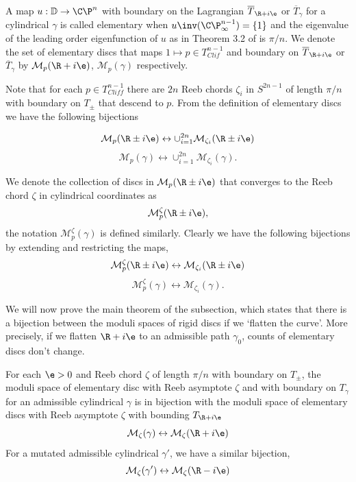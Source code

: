 \begin{defn}
A map $u: \mathbb{D} \to \C\P^n$  with boundary on the Lagrangian $\overline T_{\R+i\e}$ or $\overline T_\gamma$ for a cylindrical $\gamma$  is called elementary when $u\inv(\C\P_\infty^{n-1})=\{1\}$ and the eigenvalue of the leading order eigenfunction of $u$ as in Theorem 3.2 of \cite{schm} is $\pi/n$. We denote the set of elementary discs that maps $1 \mapsto p \in T^{n-1}_{Clif}$  and boundary on $\overline T_{\R+i\e}$ or $\overline T_\gamma$ by $\mathcal{M}_p(\R+i\e)$, $\mathcal M_p{(\gamma)}$ respectively.
\end{defn}

 Note that for each $p\in T_{Cliff}^{n-1}$ there are $2n$ Reeb chords $\zeta_i$ in $S^{2n-1}$ of length $\pi/n$ with boundary on $T_\pm$ that descend to $p$. From the definition of elementary discs we have the following bijections 

\begin{equation*}
    \mathcal{M}_p(\R \pm i\e) \leftrightarrow \cup_{i=1}^{2n} \mathcal{M}_{\zeta_i}(\R\pm i\e)
\end{equation*}
\begin{equation*}
    \mathcal{M}_p(\gamma) \leftrightarrow \cup_{i=1}^{2n} \mathcal{M}_{\zeta_i}(\gamma).
\end{equation*}

\noindent We denote the collection of discs in $\mathcal M_p(\R \pm i\e)$ that converges to the Reeb chord $\zeta$ in cylindrical coordinates as $$\mathcal M_p^\zeta (\R \pm i\e),$$ the notation $\mathcal{M}_p^{\zeta}(\gamma)$ is defined similarly. Clearly  we have the following bijections by extending and restricting the maps, $$\mathcal M_p^\zeta(\R \pm i\e) \leftrightarrow \mathcal{M}_{\zeta_i}(\R\pm i\e) $$ $$\mathcal M_p^\zeta(\gamma) \leftrightarrow \mathcal{M}_{\zeta_i}(\gamma) .$$


We will now prove the main theorem of the subsection, which states that there is a bijection between the moduli spaces of rigid discs if we `flatten the curve'. More precisely, if we flatten $\R + i \e$ to an admissible path $\gamma_0$, counts of elementary discs don't change.


\begin{Theorem}
\label{thm:flattenning}
For each $\e>0$ and Reeb chord $\zeta$ of length $\pi/n$ with boundary on $T_\pm$, the moduli space of elementary disc with Reeb asymptote $\zeta$ and  with boundary on $T_\gamma$ for an admissible cylindrical $\gamma$ is in bijection with the moduli space of elementary discs with Reeb asymptote $\zeta$ with bounding $T_{\R + i\e}$
$$\mathcal M_\zeta{(\gamma)} \leftrightarrow \mathcal M_\zeta{(\R + i\e)}$$
For a mutated admissible cylindrical $\gamma'$, we have a similar bijection,
$$\mathcal M_\zeta{(\gamma')} \leftrightarrow \mathcal M_\zeta{(\R - i\e)}$$


\end{Theorem}


